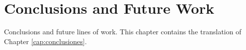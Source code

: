 \chapter{Conclusions and Future Work}
\label{cap:conclusions}

Conclusions and future lines of work. This chapter contains the translation of Chapter \ref{cap:conclusiones}.


